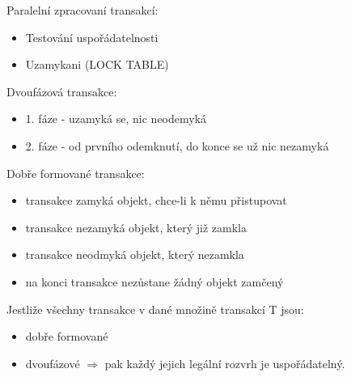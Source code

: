 \documentclass{szzclass}
\begin{document}
Paralelní zpracovaní transakcí:
\begin{itemize}
\item Testování uspořádatelnosti
\item Uzamykani (LOCK TABLE)
\end{itemize}

Dvoufázová transakce:
\begin{itemize}
\item 1. fáze - uzamyká se, nic neodemyká
\item 2. fáze - od prvního odemknutí, do konce se už nic nezamyká
\end{itemize}

Dobře formované transakce:
\begin{itemize}
\item transakce zamyká objekt, chce-li k němu přistupovat
\item transakce nezamyká objekt, který již zamkla
\item transakce neodmyká objekt, který nezamkla
\item na konci transakce nezůstane žádný objekt zamčený
\end{itemize}

Jestliže všechny transakce v dané množině transakcí T jsou:

\begin{itemize}
\item dobře formované
\item dvoufázové $\Rightarrow$ pak každý jejich legální rozvrh je uspořádatelný.
\end{itemize}
\end{document}
